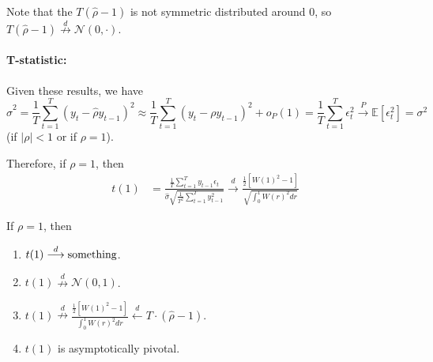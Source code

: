 \documentclass[11pt]{elegantbook}
\begin{document}
Note that the $T(\hat{\rho}-1)$ is not symmetric distributed around 0, so $T(\hat{\rho}-1)\stackrel{d}{\nrightarrow} \mathcal{N}(0,\cdot)$.


\paragraph*{T-statistic:}
Given these results, we have
$$\hat{\sigma}^2=\frac{1}{T}\sum_{t=1}^T(y_t-\hat{\rho}y_{t-1})^2 \approx \frac{1}{T}\sum_{t=1}^T(y_t-\rho y_{t-1})^2+o_P(1)=\frac{1}{T}\sum_{t=1}^T\epsilon_t^2 \stackrel{P}{\longrightarrow} \mathbb{E}[\epsilon_t^2]=\sigma^2$$ (if $|\rho|<1$ or if $\rho=1$).

Therefore, if $\rho=1$, then
\begin{equation}
    \begin{aligned}
        t(1)&=\frac{\frac{1}{T}\sum_{t=1}^Ty_{t-1}\epsilon_t}{\hat{\sigma}\sqrt{\frac{1}{T^2}\sum_{t=1}^Ty_{t-1}^2}} \stackrel{d}{\longrightarrow} \frac{\frac{1}{2}\left[W(1)^2-1\right]}{\sqrt{\int_0^1 W(r)^2 dr}}
    \end{aligned}
    \nonumber
\end{equation}

\begin{remark}
    If $\rho=1$, then
    \begin{enumerate}
        \item $t(1) \stackrel{d}{\longrightarrow} \textnormal{something}$.
        \item $t(1) \stackrel{d}{\nrightarrow} \mathcal{N}(0,1)$.
        \item $t(1) \stackrel{d}{\nrightarrow} \frac{\frac{1}{2}\left[W(1)^2-1\right]}{\int_0^1 W(r)^2 dr}\stackrel{d}{\leftarrow} T\cdot(\hat{\rho}-1)$.
        \item $t(1)$ is asymptotically pivotal.
    \end{enumerate}
\end{remark}












\appendix

\end{document}
